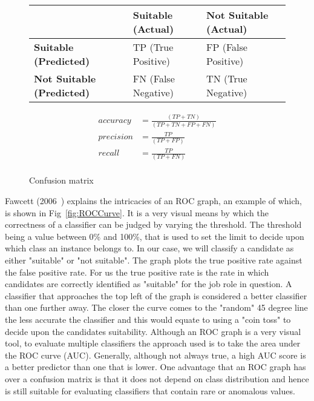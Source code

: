 \begin{figure}[h]
    \caption{Confusion matrix} \label{fig:ConfusionMatrix}
    \begin{tabular}{|l|l|l|}
        \hline
                                          & \textbf{Suitable (Actual)} & \textbf{Not Suitable (Actual)} \\ \hline
        \textbf{Suitable (Predicted)}     & TP (True Positive)         & FP (False Positive)            \\ \hline
        \textbf{Not Suitable (Predicted)} & FN (False Negative)        & TN (True Negative)             \\ \hline
    \end{tabular}

    \begin{align*}
        accuracy  & = \frac{(TP+TN)}{(TP+TN+FP+FN)} \\
        precision & = \frac{TP}{(TP+FP)}            \\
        recall    & = \frac{TP}{(TP+FN)}            \\
    \end{align*}

\end{figure}


\noindent
Fawcett (2006~\cite{fawcett2006introduction}) explains the intricacies of an ROC graph, an example of which, is shown in Fig~\ref{fig:ROCCurve}. It is a very visual means by which the correctness of a classifier can be judged by varying the threshold. The threshold being a value between 0\% and 100\%, that is used to set the limit to decide upon which class an instance belongs to. In our case, we will classify a candidate as either "suitable" or "not suitable". The graph plots the true positive rate against the false positive rate. For us the true positive rate is the rate in which candidates are correctly identified as "suitable" for the job role in question. A classifier that approaches the top left of the graph is considered a better classifier than one further away. The closer the curve comes to the "random" 45 degree line the less accurate the classifier and this would equate to using a "coin toss" to decide upon the candidates suitability. Although an ROC graph is a very visual tool, to evaluate multiple classifiers the approach used is to take the area under the ROC curve (AUC). Generally, although not always true, a high AUC score is a better predictor than one that is lower. One advantage that an ROC graph has over a confusion matrix is that it does not depend on class distribution and hence is still suitable for evaluating classifiers that contain rare or anomalous values.

